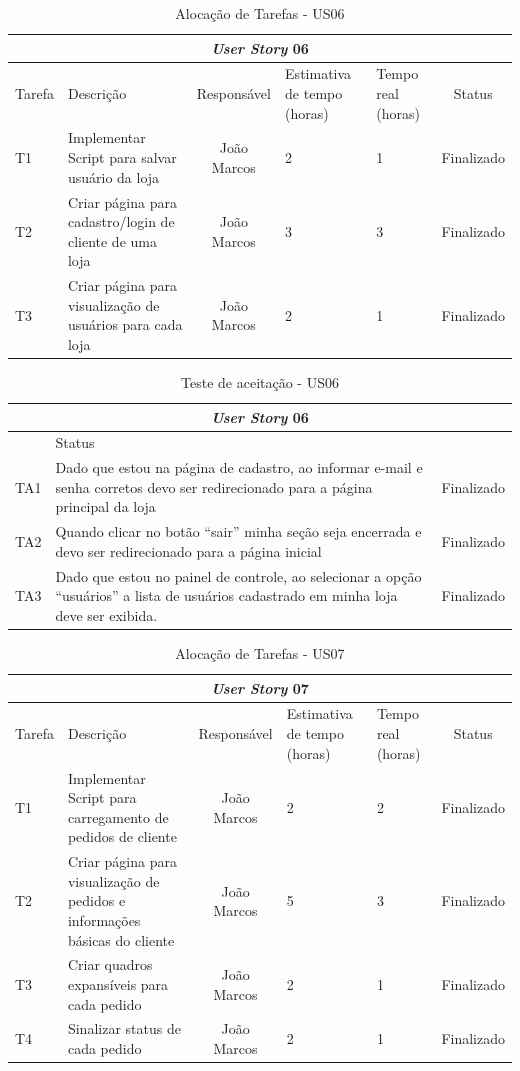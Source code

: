 \documentclass[a4paper,12pt]{monografia}
\begin{document}
\begin{longtable}{|p{1.5cm}|p{3.5cm}|c|p{2cm}|p{2cm}|c|}
\caption{Alocação de Tarefas - US06}
\label{quadro:tat-us06}
\hline
\multicolumn{6}{|c|}{\textbf{\textit{User Story} 06}}\\
\hline		
\rowcolor{ballblue}
Tarefa & Descrição & Responsável & Estimativa de tempo (horas) & Tempo real (horas) & Status\\
\hline
T1 & Implementar Script para salvar usuário da loja & João Marcos & 2 & 1 & Finalizado\\
\hline
T2 & Criar página para cadastro/login de cliente de uma loja & João Marcos & 3 & 3 & Finalizado\\
\hline
T3 & Criar página para visualização de usuários para cada loja & João Marcos & 2 & 1 & Finalizado\\
\end{longtable}

\begin{longtable}{|l|p{11.8cm}|c|}
\caption{Teste de aceitação - US06}
\label{quadro:teste-aceitacao-us06}
\hline
\multicolumn{3}{|c|}{\textbf{\textit{User Story} 06}}\\
\hline		
\rowcolor{ballblue}
\multicolumn{2}{|c|}{Testes de aceitação} & Status\\	
\hline
TA1 & Dado que estou na página de cadastro, ao informar e-mail e senha corretos devo ser redirecionado para a página principal da loja & Finalizado\\
\hline
TA2 & Quando clicar no botão ``sair'' minha seção seja encerrada e devo ser redirecionado para a página inicial  & Finalizado\\
\hline
TA3 & Dado que estou no painel de controle, ao selecionar a opção ``usuários'' a lista de usuários cadastrado em minha loja deve ser exibida.   & Finalizado\\
\hline
\end{longtable}


\begin{longtable}{|p{1.5cm}|p{3.5cm}|c|p{2cm}|p{2cm}|c|}
\caption{Alocação de Tarefas - US07}
\label{quadro:tat-us07}
\hline
\multicolumn{6}{|c|}{\textbf{\textit{User Story} 07}}\\
\hline		
\rowcolor{ballblue}
Tarefa & Descrição & Responsável & Estimativa de tempo (horas) & Tempo real (horas) & Status\\
\hline
T1 & Implementar Script para carregamento de pedidos de cliente & João Marcos & 2 & 2 & Finalizado\\
\hline
T2 & Criar página para visualização de pedidos e informações básicas do cliente & João Marcos & 5 & 3 & Finalizado\\
\hline
T3 & Criar quadros expansíveis para cada pedido & João Marcos & 2 & 1 & Finalizado\\
\hline
T4 & Sinalizar status de cada pedido & João Marcos & 2 & 1 & Finalizado\\
\hline
\end{longtable}
\end{document}

